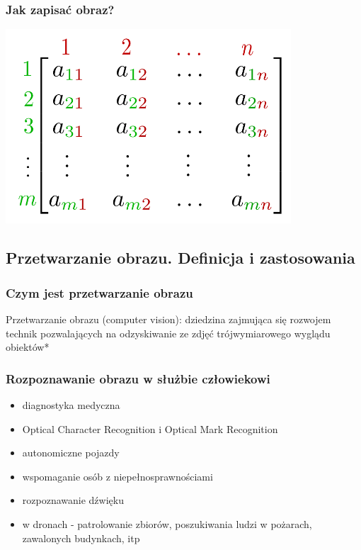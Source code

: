 \documentclass{beamer}
\begin{document}
            \begin{frame}
                \begin{center}
                    \frametitle{Jak zapisać obraz?}
                    \includegraphics[width=0.8\textwidth]{pictures/matrix.png}
                \end{center}
            \end{frame}
        
        \subsection{Przetwarzanie obrazu. Definicja i zastosowania}

            \begin{frame}
                \frametitle{Czym jest przetwarzanie obrazu}
                Przetwarzanie obrazu (computer vision): dziedzina zajmująca się rozwojem technik pozwalających na odzyskiwanie ze zdjęć trójwymiarowego wyglądu obiektów*
            \end{frame}

            \begin{frame}
                \frametitle{Rozpoznawanie obrazu w służbie człowiekowi}
                \begin{itemize}
                    \item diagnostyka medyczna
                    \item Optical Character Recognition i Optical Mark Recognition
                    \item autonomiczne pojazdy
                    \item wspomaganie osób z niepełnosprawnościami
                    \item rozpoznawanie dźwięku
                    \item w dronach - patrolowanie zbiorów, poszukiwania ludzi w pożarach, zawalonych budynkach, itp
                \end{itemize}
            \end{frame}
\end{document}

